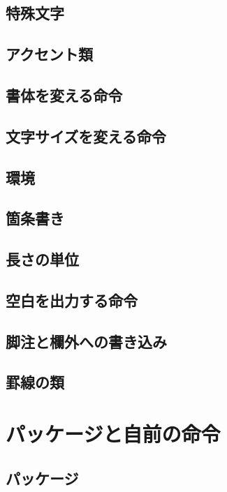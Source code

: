 \documentclass{jsbook}
\begin{document}
\section{特殊文字}

\section{アクセント類}

\section{書体を変える命令}

\section{文字サイズを変える命令}

\section{環境}

\section{箇条書き}

\section{長さの単位}

\section{空白を出力する命令}

\section{脚注と欄外への書き込み}

\section{罫線の類}

\chapter{パッケージと自前の命令}

\section{パッケージ}
\end{document}
